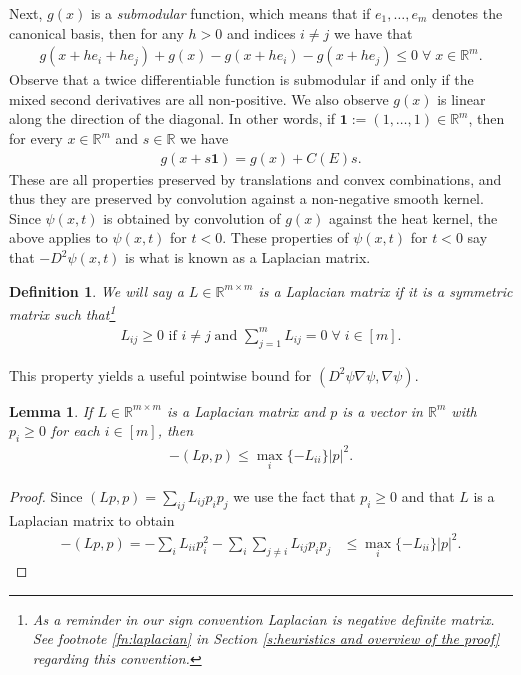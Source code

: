\documentclass[reqno]{amsart}
\newtheorem{lemma}[theorem]{Lemma}
\newtheorem{defn}[theorem]{Definition}
\numberwithin{equation}{section}
\newcommand{\R}{\mathbb R}
\begin{document}
Next, $g(x)$ is a \emph{submodular} function,  which means that  if $e_1,\ldots,e_m$ denotes the canonical basis, then for any $h>0$ and indices $i\neq j$ we have that
\begin{align*}
  g(x+he_i+he_j)+g(x)-g(x+he_i)-g(x+he_j) \leq 0 \;\forall \;x \in \mathbb{R}^m.   
\end{align*}
Observe that a twice differentiable function is submodular if and only if the mixed second derivatives are all non-positive. We also observe $g(x)$ is linear along the direction of the diagonal. In other words, if $\mathbf{1} := (1,\ldots,1) \in\mathbb{R}^m$, then  for every $x \in \mathbb{R}^m$ and $s\in \mathbb{R}$ we have
\begin{align*}
  g(x+s\mathbf{1}) = g(x) + C(E) s.    
\end{align*}
These are all properties preserved by translations and convex combinations, and thus they are preserved by convolution against a non-negative smooth kernel. Since $\psi(x,t)$ is obtained by convolution of $g(x)$ against the heat kernel, the above applies to $\psi(x,t)$ for $t<0$. These properties of $\psi(x,t)$ for $t<0$ say that $-D^2\psi(x,t)$ is what is known as a Laplacian matrix.

\begin{defn}\label{def:Laplacian matrix}
We will say a $L\in \R^{m\times m}$ is a Laplacian matrix if  it is a symmetric matrix such that\footnote{As a reminder in our sign convention Laplacian is negative definite matrix. See  footnote \ref{fn:laplacian} in Section \ref{s:heuristics and overview of the proof} regarding this convention.}
\begin{align*}
  L_{ij} \geq 0 \text{ if } i\neq j\; \text{and } \sum_{j=1}^mL_{ij} = 0 \;\forall \;i \in [m].
\end{align*}

\end{defn}

This property  yields a useful pointwise bound for $(D^2\psi \nabla \psi,\nabla \psi)$.

\begin{lemma}\label{l:submodularity infinity Laplacian bound}
If $L\in \R^{m\times m}$ is a Laplacian matrix and $p$ is a vector in $\R^m$ with $p_i\geq 0$ for each $i \in [m]$, then 
\begin{align*}
 -(Lp,p) \leq \max_i \{-L_{ii}\}|p|^2.
\end{align*}
\end{lemma}
\begin{proof}
Since $(Lp,p) = \sum_{ij}L_{ij}p_ip_j$ we use the fact that $p_i\geq 0$ and that $L$ is a Laplacian matrix to obtain
\begin{align*}
  -(Lp,p) = -\sum_{i}L_{ii}p_i^2-\sum_i\sum_{j\neq i}L_{ij}p_ip_j & \leq \max_i\{-L_{ii}\}|p|^2.  
\end{align*}


\end{proof}
\end{document}

